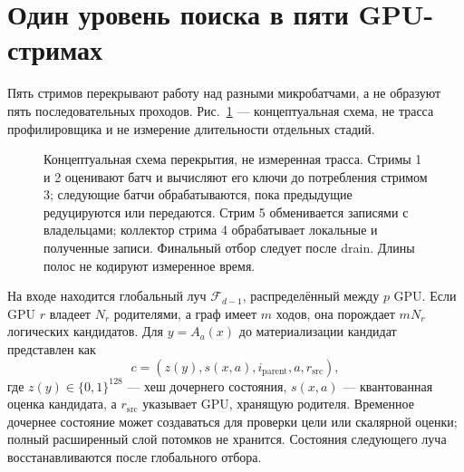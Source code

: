 \documentclass[10pt,twocolumn]{article}
\newcommand{\frontier}{\mathcal{F}}
\begin{document}
\section{Один уровень поиска в пяти GPU-стримах}
Пять стримов перекрывают работу над разными микробатчами, а не образуют пять
последовательных проходов. Рис.~\ref{fig:overlap} --- концептуальная схема,
не трасса профилировщика и не измерение длительности отдельных стадий.

\begin{figure}[t]
\centering
{}
\caption{Концептуальная схема перекрытия, не измеренная трасса. Стримы 1 и 2
оценивают батч и вычисляют его ключи до потребления стримом 3; следующие батчи
обрабатываются, пока предыдущие редуцируются или передаются. Стрим 5
обменивается записями с владельцами; коллектор стрима 4 обрабатывает локальные
и полученные записи. Финальный отбор следует после drain. Длины полос не
кодируют измеренное время.}
\label{fig:overlap}
\end{figure}

На входе находится глобальный луч $\frontier_{d-1}$, распределённый между $p$
GPU. Если GPU $r$ владеет $N_r$ родителями, а граф имеет $m$ ходов, она
порождает $mN_r$ логических кандидатов. Для $y=A_a(x)$ до материализации
кандидат представлен как
\begin{equation}
 c=(z(y),s(x,a),i_{\mathrm{parent}},a,r_{\mathrm{src}}),
 \label{eq:candidate}
\end{equation}
где $z(y)\in\{0,1\}^{128}$ --- хеш дочернего состояния,
$s(x,a)$ --- квантованная оценка кандидата, а
$r_{\mathrm{src}}$ указывает GPU, хранящую родителя. Временное дочернее
состояние может создаваться для проверки цели или скалярной оценки; полный
расширенный слой потомков не хранится. Состояния следующего луча
восстанавливаются после глобального отбора.
\end{document}
